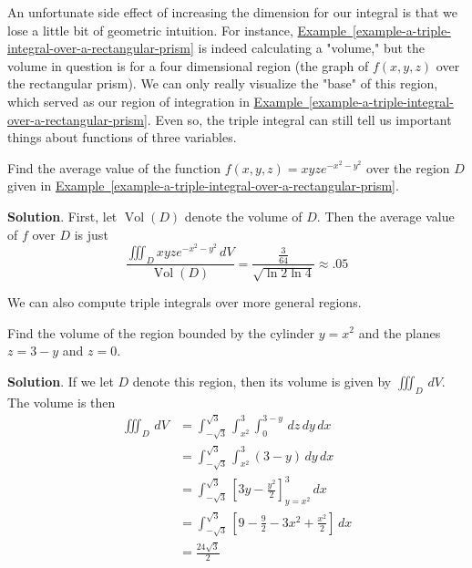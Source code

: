 \documentclass[10pt,]{book}
\theoremstyle{ptxplainnotitle}
\theoremstyle{ptxplaintitle}
\theoremstyle{ptxplainnotitle}
\theoremstyle{ptxplaintitle}
\theoremstyle{ptxplainnotitle}
\theoremstyle{ptxplaintitle}
\theoremstyle{ptxdefinitionnotitle}
\theoremstyle{ptxdefinitiontitle}
\theoremstyle{ptxdefinitionnotitle}
\theoremstyle{ptxdefinitiontitle}
\theoremstyle{ptxdefinitionnotitle}
\theoremstyle{ptxdefinitiontitle}
\theoremstyle{ptxdefinitionnotitle}
\theoremstyle{ptxdefinitiontitle}
\theoremstyle{ptxdefinitionnotitle}
\theoremstyle{ptxdefinitiontitle}
\numberwithin{equation}{section}
\begin{document}
\hypertarget{p-1167}{}%
An unfortunate side effect of increasing the dimension for our integral is that we lose a little bit of geometric intuition. For instance, \hyperref[example-a-triple-integral-over-a-rectangular-prism]{Example~\ref{example-a-triple-integral-over-a-rectangular-prism}} is indeed calculating a "volume," but the volume in question is for a four dimensional region (the graph of \(f(x,y,z)\) over the rectangular prism). We can only really visualize the "base" of this region, which served as our region of integration in \hyperref[example-a-triple-integral-over-a-rectangular-prism]{Example~\ref{example-a-triple-integral-over-a-rectangular-prism}}. Even so, the triple integral can still tell us important things about functions of three variables.%
\begin{example}\label{example-finding-an-average-value}
\hypertarget{p-1168}{}%
Find the average value of the function \(f(x,y,z) = xyze^{-x^{2} - y^{2}}\) over the region \(D\) given in \hyperref[example-a-triple-integral-over-a-rectangular-prism]{Example~\ref{example-a-triple-integral-over-a-rectangular-prism}}.%
\par\smallskip%
\noindent\textbf{Solution}.\hypertarget{solution-187}{}\quad%
\hypertarget{p-1169}{}%
First, let \(\operatorname{Vol}(D)\) denote the volume of \(D\). Then the average value of \(f\) over \(D\) is just%
\begin{equation*}
\frac{\iiint_{D}xyze^{-x^{2} - y^{2}}\,dV}{\operatorname{Vol}(D)} = \frac{\frac{3}{64}}{\sqrt{\ln2\ln4}} \approx .05
\end{equation*}
%
\end{example}
\hypertarget{p-1170}{}%
We can also compute triple integrals over more general regions.%
\begin{example}\label{example-volume-using-triple-integrals}
\hypertarget{p-1171}{}%
Find the volume of the region bounded by the cylinder \(y = x^{2}\) and the planes \(z = 3-y\) and \(z=0\).%
\par\smallskip%
\noindent\textbf{Solution}.\hypertarget{solution-188}{}\quad%
\hypertarget{p-1172}{}%
If we let \(D\) denote this region, then its volume is given by \(\iiint_{D}\,dV\). The volume is then%
\begin{align*}
\iiint_{D}\,dV & = \int_{-\sqrt{3}}^{\sqrt{3}}\int_{x^{2}}^{3}\int_{0}^{3-y}\,dz\,dy\,dx \\
& = \int_{-\sqrt{3}}^{\sqrt{3}}\int_{x^{2}}^{3} (3-y)\,dy\,dx \\
& = \int_{-\sqrt{3}}^{\sqrt{3}}\left[3y-\frac{y^{2}}{2}\right]_{y=x^{2}}^{3}\,dx \\
& = \int_{-\sqrt{3}}^{\sqrt{3}}\left[9 - \frac{9}{2} - 3x^{2} + \frac{x^{2}}{2}\right]\,dx \\
& = \frac{24\sqrt{3}}{2} 
\end{align*}
%
\end{example}
\end{document}
